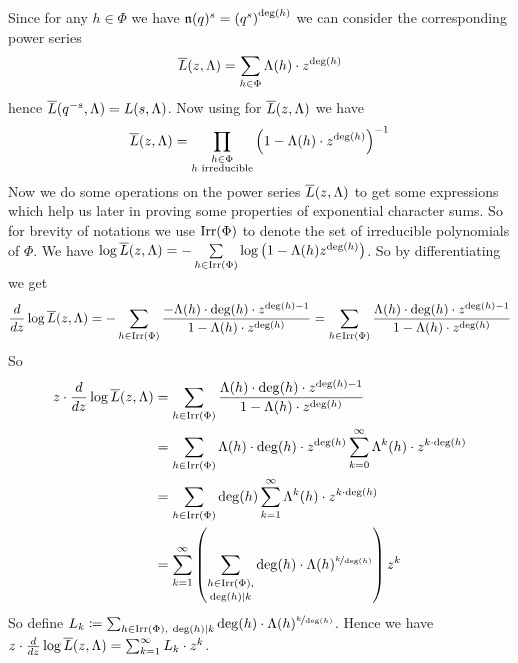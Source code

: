 Since for any $h\in\Phi$ we have $\mathfrak{n}(q)^s=\left(q^s\right)^{\deg(h)}$ we can consider the corresponding power series $$\overline{L}(z,\Lambda)=\sum_{h\in\Phi}\Lambda(h)\cdot z^{\deg(h)}$$hence $\overline{L}(q^{-s},\Lambda)=L(s,\Lambda)$. Now using  for $\overline{L}(z,\Lambda)$ we have $$\overline{L}(z,\Lambda)=\prod_{\substack{h\in\Phi\\ h\text{ irreducible}}}\left(1-\Lambda(h)\cdot z^{\deg(h)}\right)^{-1}$$Now we do some operations on the power series $\overline{L}(z,\Lambda)$ to get some expressions which help us later in proving some properties of exponential character sums. So for brevity of notations we use $\operatorname{Irr}(\Phi)$ to denote the set of irreducible polynomials of $\Phi$. We have $\log \overline{L}(z,\Lambda)=-\sum\limits_{h\in\operatorname{Irr}(\Phi)}\log \left(1-\Lambda(h)z^{\deg(h)}\right)$. So by differentiating we get $$\frac{d}{dz}\log \overline{L}(z,\Lambda) =-\sum\limits_{h\in\operatorname{Irr}(\Phi)}\frac{-\Lambda(h)\cdot \deg(h)\cdot z^{\deg(h)-1}}{1-\Lambda(h)\cdot z^{\deg(h)}}=\sum\limits_{h\in\operatorname{Irr}(\Phi)}\frac{\Lambda(h)\cdot \deg(h)\cdot z^{\deg(h)-1}}{1-\Lambda(h)\cdot z^{\deg(h)}}$$So \begin{align}
  z\cdot \frac{d}{dz}\log \overline{L}(z,\Lambda) & = \sum\limits_{h\in\operatorname{Irr}(\Phi)}\frac{\Lambda(h)\cdot \deg(h)\cdot z^{\deg(h)-1}}{1-\Lambda(h)\cdot z^{\deg(h)}}\notag\\
  & = \sum_{h\in\operatorname{Irr}(\Phi)}\Lambda(h)\cdot \deg(h)\cdot z^{\deg(h)}\sum_{k=0}^{\infty}\Lambda^k(h)\cdot z^{k\cdot \deg(h)}\notag\\
  & = \sum_{h\in\operatorname{Irr}(\Phi)}\deg(h)\sum_{k=1}^{\infty}\Lambda^k(h)\cdot z^{k\cdot \deg(h)}\notag\\
  & = \sum_{k=1}^{\infty}\left(\sum_{\substack{h\in\operatorname{Irr}(\Phi),\\[0.5mm] \deg(h)\mid k}}\deg(h)\cdot \Lambda(h)^{\nicefrac{k}{\deg(h)}}\right)z^k \label{eq:l-log-deriv-irreducibles}
\end{align}
So define $L_k\coloneqq  \sum_{h\in\operatorname{Irr}(\Phi),\ \deg(h)\mid k}\deg(h)\cdot \Lambda(h)^{\nicefrac{k}{\deg(h)}}$. Hence we have $z\cdot \frac{d}{dz}\log \overline{L}(z,\Lambda)=\sum_{k=1}^{\infty}L_k\cdot z^k$. 

